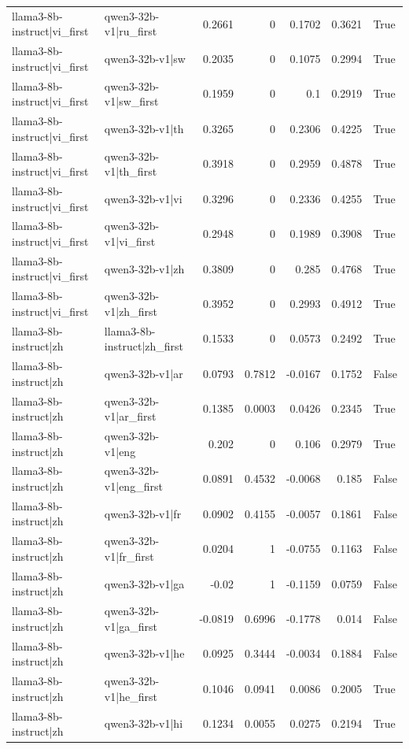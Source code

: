 \begin{table}
\begin{tabular}{l l r r r r l}
llama3-8b-instruct|vi_first & qwen3-32b-v1|ru_first & 0.2661 & 0 & 0.1702 & 0.3621 & True \\
llama3-8b-instruct|vi_first & qwen3-32b-v1|sw & 0.2035 & 0 & 0.1075 & 0.2994 & True \\
llama3-8b-instruct|vi_first & qwen3-32b-v1|sw_first & 0.1959 & 0 & 0.1 & 0.2919 & True \\
llama3-8b-instruct|vi_first & qwen3-32b-v1|th & 0.3265 & 0 & 0.2306 & 0.4225 & True \\
llama3-8b-instruct|vi_first & qwen3-32b-v1|th_first & 0.3918 & 0 & 0.2959 & 0.4878 & True \\
llama3-8b-instruct|vi_first & qwen3-32b-v1|vi & 0.3296 & 0 & 0.2336 & 0.4255 & True \\
llama3-8b-instruct|vi_first & qwen3-32b-v1|vi_first & 0.2948 & 0 & 0.1989 & 0.3908 & True \\
llama3-8b-instruct|vi_first & qwen3-32b-v1|zh & 0.3809 & 0 & 0.285 & 0.4768 & True \\
llama3-8b-instruct|vi_first & qwen3-32b-v1|zh_first & 0.3952 & 0 & 0.2993 & 0.4912 & True \\
llama3-8b-instruct|zh & llama3-8b-instruct|zh_first & 0.1533 & 0 & 0.0573 & 0.2492 & True \\
llama3-8b-instruct|zh & qwen3-32b-v1|ar & 0.0793 & 0.7812 & -0.0167 & 0.1752 & False \\
llama3-8b-instruct|zh & qwen3-32b-v1|ar_first & 0.1385 & 0.0003 & 0.0426 & 0.2345 & True \\
llama3-8b-instruct|zh & qwen3-32b-v1|eng & 0.202 & 0 & 0.106 & 0.2979 & True \\
llama3-8b-instruct|zh & qwen3-32b-v1|eng_first & 0.0891 & 0.4532 & -0.0068 & 0.185 & False \\
llama3-8b-instruct|zh & qwen3-32b-v1|fr & 0.0902 & 0.4155 & -0.0057 & 0.1861 & False \\
llama3-8b-instruct|zh & qwen3-32b-v1|fr_first & 0.0204 & 1 & -0.0755 & 0.1163 & False \\
llama3-8b-instruct|zh & qwen3-32b-v1|ga & -0.02 & 1 & -0.1159 & 0.0759 & False \\
llama3-8b-instruct|zh & qwen3-32b-v1|ga_first & -0.0819 & 0.6996 & -0.1778 & 0.014 & False \\
llama3-8b-instruct|zh & qwen3-32b-v1|he & 0.0925 & 0.3444 & -0.0034 & 0.1884 & False \\
llama3-8b-instruct|zh & qwen3-32b-v1|he_first & 0.1046 & 0.0941 & 0.0086 & 0.2005 & True \\
llama3-8b-instruct|zh & qwen3-32b-v1|hi & 0.1234 & 0.0055 & 0.0275 & 0.2194 & True \\

\end{tabular}
\end{table}
